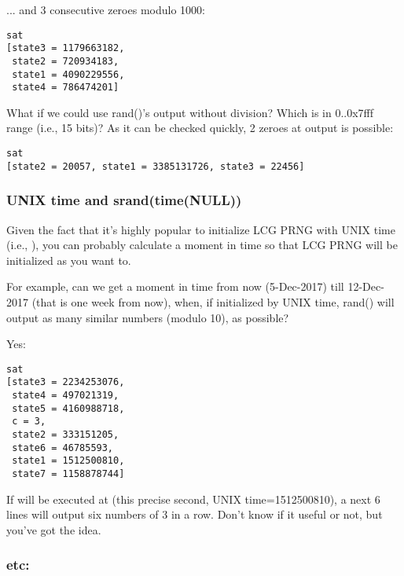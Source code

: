 ... and 3 consecutive zeroes modulo 1000:



\begin{lstlisting}
sat
[state3 = 1179663182,
 state2 = 720934183,
 state1 = 4090229556,
 state4 = 786474201]
\end{lstlisting}

What if we could use rand()'s output without division? Which is in 0..0x7fff range (i.e., 15 bits)?
As it can be checked quickly, 2 zeroes at output is possible:



\begin{lstlisting}
sat
[state2 = 20057, state1 = 3385131726, state3 = 22456]
\end{lstlisting}

\subsubsection{UNIX time and srand(time(NULL))}

Given the fact that it's highly popular to initialize LCG PRNG with UNIX time (i.e., ), you can probably calculate a moment in time so that LCG PRNG will be initialized as you want to.

For example, can we get a moment in time from now (5-Dec-2017) till 12-Dec-2017 (that is one week from now), when, if initialized by UNIX time, rand() will output as many similar numbers (modulo 10), as possible?



Yes:

\begin{lstlisting}
sat
[state3 = 2234253076,
 state4 = 497021319,
 state5 = 4160988718,
 c = 3,
 state2 = 333151205,
 state6 = 46785593,
 state1 = 1512500810,
 state7 = 1158878744]
\end{lstlisting}

If  will be executed at  (this precise second, UNIX time=1512500810),
a next 6  lines will output six numbers of 3 in a row.
Don't know if it useful or not, but you've got the idea.

\subsubsection{etc:}

